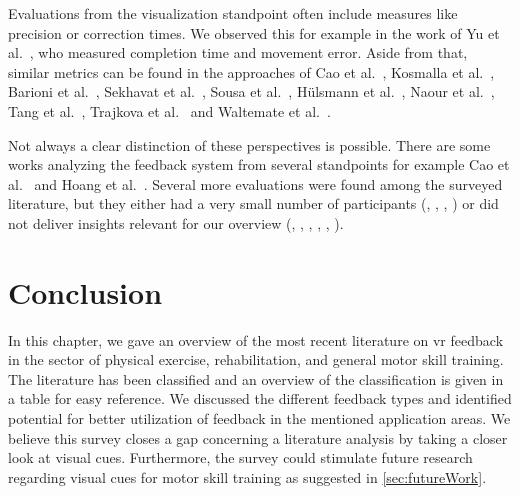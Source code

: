 Evaluations from the visualization standpoint often include measures like precision or correction times. We observed this for example in the work of Yu et al.~\cite{yu2020pmd}, who measured completion time and movement error. Aside from that, similar metrics can be found in the approaches of Cao et al.~\cite{cao2020esa}, Kosmalla et al.~\cite{kosmalla2017cvi}, Barioni et al.~\cite{hoang2016orp}, Sekhavat et al.~\cite{sekhavat2018pba}, Sousa et al.~\cite{sousa2016sar}, Hülsmann et al.~\cite{huelsmann2019ssp}, Naour et al.~\cite{naour2019s3d}, Tang et al.~\cite{tang2015pah}, Trajkova et al.~\cite{trajkova2018ttb} and Waltemate et al.~\cite{waltemate2016tlp}.

Not always a clear distinction of these perspectives is possible. There are some works analyzing the feedback system from several standpoints for example Cao et al.~\cite{cao2020esa} and Hoang et al.~\cite{hoang2016orp}. Several more evaluations were found among the surveyed literature, but they either had a very small number of participants (\cite{oshita2018sts}, \cite{meyer2018jlc}, \cite{escalona2020eva}, \cite{conner2016cef}) or did not deliver insights relevant for our overview (\cite{clarke2020rva}, \cite{han2016ara}, \cite{pereira2017jat}, \cite{caserman2021fbm}, \cite{vidal2020blo}, \cite{oka2021rtf}).

\section{Conclusion \label{sec:tvcg:conclusion}}
In this chapter, we gave an overview of the most recent literature on \acrshort{vr} feedback in the sector of physical exercise, rehabilitation, and general motor skill training. The literature has been classified and an overview of the classification is given in a table for easy reference. We discussed the different feedback types and identified potential for better utilization of feedback in the mentioned application areas.
We believe this survey closes a gap concerning a literature analysis by taking a closer look at visual cues. Furthermore, the survey could stimulate future research regarding visual cues for motor skill training as suggested in \autoref{sec:futureWork}.

